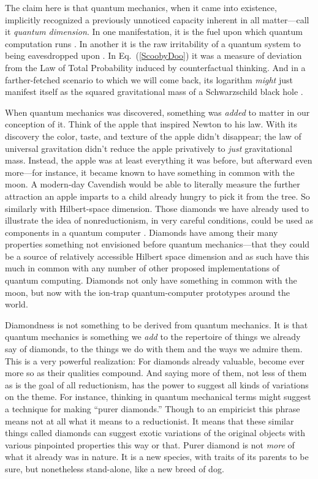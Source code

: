 The claim here is that quantum mechanics, when it came into existence, implicitly recognized a previously unnoticed capacity inherent in all matter---call it {\it quantum dimension}.  In one manifestation, it is the fuel upon which quantum computation runs \cite{Fuchs04b,BlumeKohout02}.  In another it is the raw irritability of a quantum system to being eavesdropped upon \cite{Fuchs03,Cerf02}.  In Eq.~(\ref{ScoobyDoo}) it was a measure of deviation from the Law of Total Probability induced by counterfactual thinking.  And in a farther-fetched scenario to which we will come back, its logarithm {\it might\/} just manifest itself as the squared gravitational mass of a Schwarzschild black hole \cite{Horowitz04,Gottesman04}.

When quantum mechanics was discovered, something was {\it added\/} to matter in our conception of it.  Think of the apple that inspired Newton to his law.  With its discovery the color, taste, and texture of the apple didn't disappear; the law of universal gravitation didn't reduce the apple privatively to {\it just\/} gravitational mass. Instead, the apple was at least everything it was before, but afterward even more---for instance, it became known to have something in common with the moon.  A modern-day Cavendish would be able to literally measure the fur\-ther attraction an apple imparts to a child already hungry to pick it from the tree.  So similarly with Hil\-bert-space dimension.  Those diamonds we have already used to illustrate the idea of nonreductionism, in very careful conditions, could be used as components in a quantum computer \cite{Prawer08}.  Diamonds have among their many properties something not envisioned before quantum mechanics---that they could be a source of relatively accessible Hilbert space dimension and as such have this much in common with any number of other proposed implementations of quantum computing.  Diamonds not only have something in common with the moon, but now with the ion-trap quantum-computer prototypes around the world.

Diamondness is not something to be derived from quantum mechanics.  It is that quantum mechanics is something we {\it add\/} to the repertoire of things we already say of diamonds, to the things we do with them and the ways we admire them.  This is a very powerful realization:  For diamonds already valuable, become ever more so as their qualities compound.  And saying more of them, not less of them as is the goal of all reductionism, has the power to suggest all kinds of variations on the theme.  For instance, thinking in quantum mechanical terms might suggest a technique for making ``purer diamonds.''  Though to an empiricist this phrase means not at all what it means to a reductionist.  It means that these similar things called diamonds can suggest exotic variations of the original objects with various pinpointed properties this way or that.  Purer diamond is not {\it more\/} of what it already was in nature.  It is a new species, with traits of its parents to be sure, but nonetheless stand-alone, like a new breed of dog.

